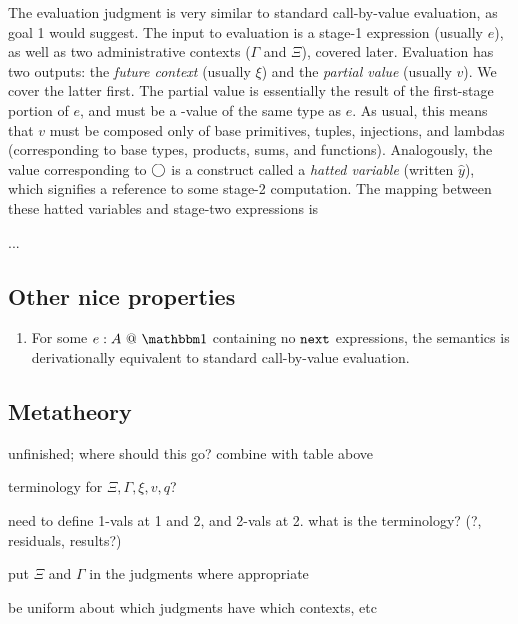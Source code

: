 The evaluation judgment is very similar to standard call-by-value evaluation, as goal 1 would suggest.  The input to evaluation is a stage-1 expression (usually $e$), as well as two administrative contexts ($\Gamma$ and $\Xi$), covered later.  Evaluation has two outputs: the {\em future context} (usually $\xi$) and the {\em partial value} (usually $v$).  We cover the latter first.  The partial value is essentially the result of the first-stage portion of $e$, and must be a \bbone-value of the same type as $e$.  As usual, this means that $v$ must be composed only of base primitives, tuples, injections, and lambdas (corresponding to base types, products, sums, and functions).  Analogously, the value corresponding to $\bigcirc$ is a construct called a {\em hatted variable} (written $\hat y$), which signifies a reference to some stage-2 computation.  The mapping between these hatted variables and stage-two expressions is

...

\subsection{Other nice properties}

\begin{enumerate}
\item For some $\colone{e}{A}$ containing no ${\tt next}$ expressions, the semantics is derivationally equivalent to standard call-by-value evaluation.
\end{enumerate}

\subsection{Metatheory}

\TODO unfinished; where should this go? combine with table above

\noindent\TODO terminology for $\Xi,\Gamma,\xi,v,q$?

\noindent\TODO need to define 1-vals at 1 and 2, and 2-vals at 2. what is the
terminology? (?, residuals, results?)

\noindent\TODO put $\Xi$ and $\Gamma$ in the judgments where appropriate

\noindent\TODO be uniform about which judgments have which contexts, etc

\newcommand{\wf}{\ \mathsf{wf}}
\newcommand{\valoo}{\ \bbone\textsf{-}\mathsf{val} @ \bbone}
\newcommand{\valot}{\ \bbone\textsf{-}\mathsf{val} @ \bbtwo}
\newcommand{\valtt}{\ \bbtwo\textsf{-}\mathsf{val} @ \bbtwo}

